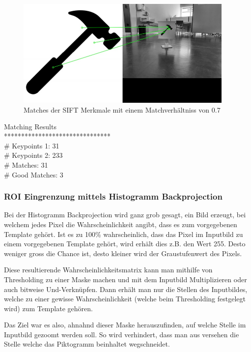 \begin{figure}[H]
  \includegraphics[width=0.95\textwidth]{img/piktogrammerkennung/sift_matches.jpg}
  \centering
  \caption{Matches der SIFT Merkmale mit einem Matchverhältniss von 0.7}
  \label{fig:orb-matches-0.75}
\end{figure}

Matching Results \\
*******************************\\
\# Keypoints 1:                           31\\
\# Keypoints 2:                           233\\
\# Matches:                               31\\
\# Good Matches:                          3\\

\subsubsection{ROI Eingrenzung mittels Histogramm Backprojection}
Bei der Histogramm Backprojection wird ganz grob gesagt, ein Bild erzeugt, bei welchem jedes Pixel die Wahrscheinlichkeit angibt, dass es zum vorgegebenen Template gehört. Ist es zu 100\% wahrscheinlich, dass das Pixel im Inputbild zu einem vorgegebenen Template gehört, wird erhält dies z.B. den Wert 255. Desto weniger gross die Chance ist, desto kleiner wird der Graustufenwert des Pixels.

Diese resultierende Wahrscheinlichkeitsmatrix kann man mithilfe von Thresholding zu einer Maske machen und mit dem Inputbild Multiplizieren oder auch bitweise Und-Verknüpfen. Dann erhält man nur die Stellen des Inputbildes, welche zu einer gewisse Wahrscheinlichkeit (welche beim Thresholding festgelegt wird) zum Template gehören. 

Das Ziel war es also, ahnahnd dieser Maske herauszufinden, auf welche Stelle im Inputbild gezoomt werden soll. So wird verhindert, dass man aus versehen die Stelle welche das Piktogramm beinhaltet wegschneidet.

